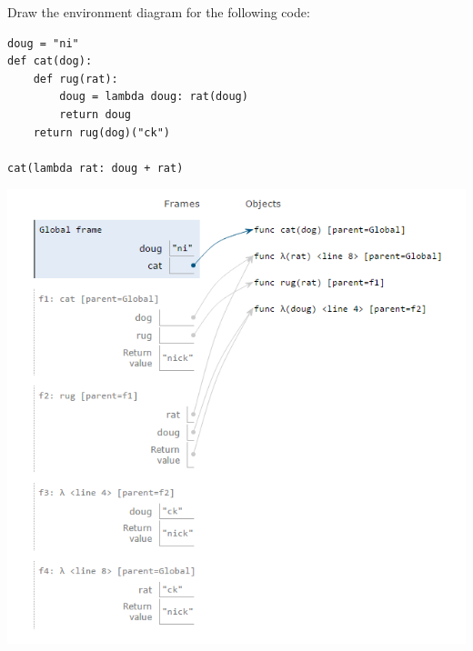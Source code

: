 \question Draw the environment diagram for the following code:
\begin{lstlisting}
doug = "ni"
def cat(dog):
    def rug(rat):
        doug = lambda doug: rat(doug)
        return doug
    return rug(dog)("ck")
    
cat(lambda rat: doug + rat)
\end{lstlisting}

\begin{solution}[6in]
\begin{center}
\includegraphics[scale=.5]{env-nick.png}
\end{center}
\end{solution}
